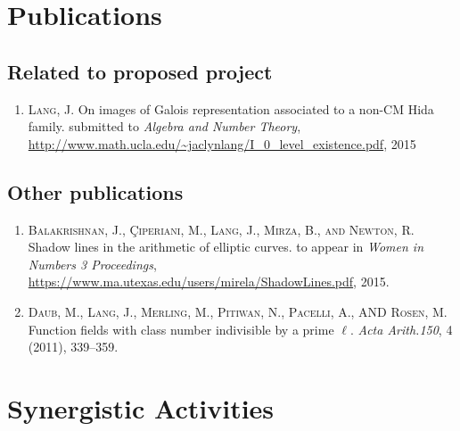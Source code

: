 \documentclass[12pt]{amsart}
\newcommand{\qtn}[1]{\textcolor{red}{#1}}
\begin{document}
\section*{Publications}
\subsection*{Related to proposed project}
\begin{enumerate}
\item \noindent L\textsc{ang}, J.  On images of Galois representation associated to a non-CM Hida family. submitted to \textit{Algebra and Number Theory}, \url{http://www.math.ucla.edu/~jaclynlang/I_0_level_existence.pdf}, 2015
\end{enumerate}

\subsection*{Other publications}
\begin{enumerate}
\item \noindent B\textsc{alakrishnan}, J.,  \c{C}\textsc{iperiani}, M.,  L\textsc{ang}, J., M\textsc{irza}, B., \textsc{and} N\textsc{ewton}, R.  Shadow lines in the arithmetic of elliptic curves. to appear in \textit{Women in Numbers 3 Proceedings}, \url{https://www.ma.utexas.edu/users/mirela/ShadowLines.pdf}, 2015.

\item \noindent D\textsc{aub}, M., L\textsc{ang}, J., M\textsc{erling}, M., P\textsc{itiwan}, N., P\textsc{acelli}, A., AND R\textsc{osen}, M.  Function fields with class number indivisible by a prime $\ell$.  \textit{Acta Arith.150}, 4 (2011), 339--359.  
\end{enumerate}

\section*{Synergistic Activities}
\end{document}
